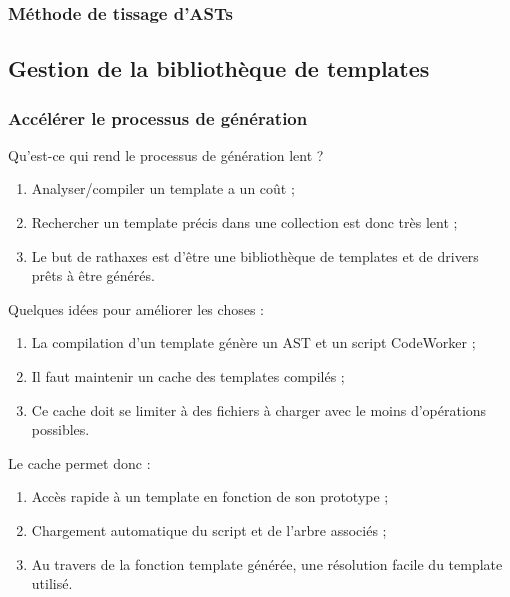 \documentclass[]{beamer}
\begin{document}
\begin{frame}
\frametitle{Méthode de tissage d'ASTs}
%
%
\end{frame}



\subsection{Gestion de la bibliothèque de templates}
\begin{frame}
\frametitle{Accélérer le processus de génération}
 {
    Qu'est-ce qui rend le processus de génération lent ?
    \begin{enumerate}[<+->]
        \item Analyser/compiler un template a un coût ;
        \item Rechercher un template précis dans une collection est donc
            très lent ;
        \item Le but de rathaxes est d'être une bibliothèque de templates
            et de drivers prêts à être générés.
    \end{enumerate}
}
 {
    Quelques idées pour améliorer les choses :
    \begin{enumerate}
        \item<4-> La compilation d'un template génère un AST et un script
            CodeWorker ;
        \item<5-> Il faut maintenir un cache des templates compilés ;
        \item<6-> Ce cache doit se limiter à des fichiers à charger avec
            le moins d'opérations possibles.
    \end{enumerate}
}
 {
    Le cache permet donc :
    \begin{enumerate}
        \item<7-> Accès rapide à un template en fonction de son prototype ;
        \item<8-> Chargement automatique du script et de l'arbre associés ;
        \item<9-> Au travers de la fonction template générée, une résolution
            facile du template utilisé.
    \end{enumerate}
}
\end{frame}
\end{document}
